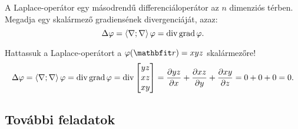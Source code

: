 \documentclass{szb-practice}
\begin{document}
\begin{definition}
  A Laplace-operátor egy másodrendű differenciáloperátor az $n$ dimenziós
  térben. Megadja egy skalármező gradiensének divergenciáját, azaz:
  $$
    \Delta \varphi
    = \left\langle\nabla;\nabla\right\rangle \varphi
    = \operatorname{div} \operatorname{grad} \varphi
    \text.
  $$
\end{definition}

\begin{example}
  Hattassuk a Laplace-operátort a $\varphi(\coordvec) = xyz$ skalármezőre!
  $$
    \Delta \varphi
    = \left\langle\nabla;\nabla\right\rangle \varphi
    = \operatorname{div} \operatorname{grad} \varphi
    = \operatorname{div} \begin{bmatrix}
      yz \\ xz \\ xy
    \end{bmatrix}
    = \pdv{yz}{x} + \pdv{xz}{y} + \pdv{xy}{z}
    = 0 + 0 + 0
    = 0
    \text.
  $$
\end{example}

\clearpage
\subsection{További feladatok}
\end{document}
